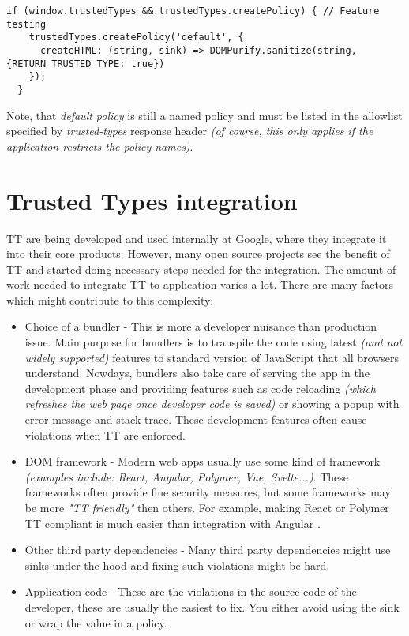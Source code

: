 \bigskip
\begin{lstlisting}[language=ES6, caption={Creating default policy}]
  if (window.trustedTypes && trustedTypes.createPolicy) { // Feature testing
    trustedTypes.createPolicy('default', {
      createHTML: (string, sink) => DOMPurify.sanitize(string, {RETURN_TRUSTED_TYPE: true})
    });
  }
\end{lstlisting}

Note, that \emph{default policy} is still a named policy and must be listed in the allowlist
specified by \emph{trusted-types} response header \emph{(of course, this only applies if the
  application restricts the policy names)}.

\section{Trusted Types integration}

TT are being developed and used internally at Google, where they integrate it into their core
products. However, many open source projects see the benefit of TT and started doing necessary steps
needed for the integration. The amount of work needed to integrate TT to application varies a lot.
There are many factors which might contribute to this complexity:

\begin{itemize}
  \item  Choice of a bundler - This is more a developer nuisance than production issue. Main purpose for
        bundlers is to transpile the code using latest \emph{(and not widely supported)} features to
        standard version of JavaScript that all browsers understand. Nowdays, bundlers also take
        care of serving the app in the development phase and providing features such as code
        reloading \emph{(which refreshes the web page once developer code is saved)} or showing a popup
        with error message and stack trace. These development features often cause violations when
        TT are enforced.
  \item DOM framework - Modern web apps usually use some kind of framework \emph{(examples include:
          React, Angular, Polymer, Vue, Svelte...)}. These frameworks often provide fine security
        measures, but some frameworks may be more \emph{"TT friendly"} then others. For example,
        making React or Polymer TT compliant is much easier than integration with Angular
        \cite{react_tt_integration} \cite{polymer_tt_integration} \cite{angular_tt_integration}.
  \item Other third party dependencies - Many third party dependencies might use sinks under the
        hood and fixing such violations might be hard.
  \item Application code - These are the violations in the source code of the developer, these are
        usually the easiest to fix. You either avoid using the sink or wrap the value in a policy.
\end{itemize}
